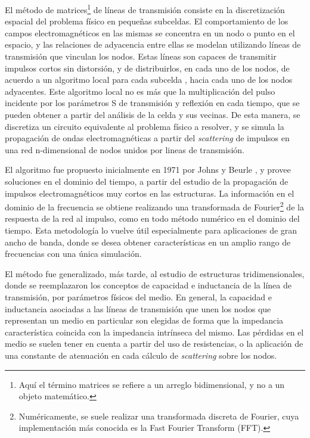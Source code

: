 El método de matrices\footnote{Aquí el término matrices se refiere a un arreglo bidimensional, y no a un objeto matemático.} de líneas de transmisión consiste en la discretización espacial del problema físico en pequeñas subceldas. El comportamiento de los campos electromagnéticos en las mismas se concentra en un nodo o punto en el espacio, y las relaciones de adyacencia entre ellas se modelan utilizando líneas de transmisión que vinculan los nodos. Estas líneas son capaces de transmitir impulsos cortos sin distorsión, y de distribuirlos, en cada uno de los nodos, de acuerdo a un algoritmo local para cada subcelda \cite{Caloz:ElectromagneticMetamaterials}, hacia cada uno de los nodos adyacentes. Este algoritmo local no es más que la multiplicación del pulso incidente por los parámetros S de transmisión y reflexión en cada tiempo, que se pueden obtener a partir del análisis de la celda y sus vecinas. De esta manera, se discretiza un circuito equivalente al problema físico a resolver, y se simula la propagación de ondas electromagnéticas a partir del \textit{scattering} de impulsos en una red n-dimensional de nodos unidos por lineas de transmisión.

El algoritmo fue propuesto inicialmente en 1971 por Johns y Beurle \cite{JohnsBeurle:TLM}, y provee soluciones en el dominio del tiempo, a partir del estudio de la propagación de impulsos electromagnéticos muy cortos en las estructuras. La información en el dominio de la frecuencia se obtiene realizando una transformada de Fourier\footnote{Numéricamente, se suele realizar una transformada discreta de Fourier, cuya implementación más conocida es la Fast Fourier Transform (FFT).} de la respuesta de la red al impulso, como en todo método numérico en el dominio del tiempo. Esta metodología lo vuelve útil especialmente para aplicaciones de gran ancho de banda, donde se desea obtener características en un amplio rango de frecuencias con una única simulación.

El método fue generalizado, más tarde, al estudio de estructuras tridimensionales, donde se reemplazaron los conceptos de capacidad e inductancia de la línea de transmisión, por parámetros físicos del medio. En general, la capacidad e inductancia asociadas a las líneas de transmisión que unen los nodos que representan un medio en particular son elegidas de forma que la impedancia característica coincida con la impedancia intrínseca del mismo. Las pérdidas en el medio se suelen tener en cuenta a partir del uso de resistencias, o la aplicación de una constante de atenuación en cada cálculo de \textit{scattering} sobre los nodos.



